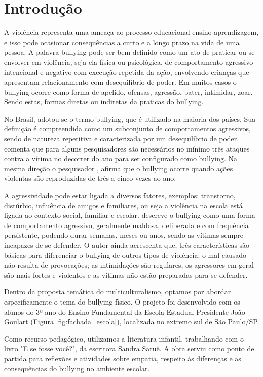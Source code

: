 \pagestyle{simple}
\chapter[]{Introdução}
A violência representa uma ameaça ao processo educacional ensino aprendizagem, e isso pode ocasionar consequências a curto e a longo prazo na vida de uma pessoa. A palavra bullying pode ser bem definido como um ato de praticar ou se envolver em violência, seja ela física ou psicológica, de comportamento agressivo intencional e negativo com execução repetida da ação, envolvendo crianças que apresentam relacionamento com desequilíbrio de poder. Em muitos casos o bullying ocorre como forma de apelido, ofensas, agressão, bater, intimidar, zoar. Sendo estas, formas diretas ou indiretas da praticas do bullying. 

No Brasil, adotou-se o termo bullying, que é utilizado na maioria dos países. Sua definição é compreendida como um subconjunto de comportamentos agressivos, sendo de natureza repetitiva e caracterizada por um desequilíbrio de poder.  comenta que para alguns pesquisadores são necessários no mínimo três ataques contra a vítima no decorrer do ano para ser configurado como bullying. Na mesma direção o pesquisador , afirma que o bullying ocorre quando ações violentas são reproduzidas de três a cinco vezes ao ano. 

A agressividade pode estar ligada a diversos fatores, exemplos: transtorno, distúrbio, influência de amigos e familiares, ou seja a violência na escola está ligada ao contexto social, familiar e escolar.  descreve o bullying como uma forma de comportamento agressivo, geralmente maldosa, deliberada e com frequência persistente, podendo durar semanas, meses ou anos, sendo as vítimas sempre incapazes de se defender. O autor ainda acrescenta que, três características são básicas para diferenciar o bullying de outros tipos de violência: o mal causado não resulta de provocações; as intimidações são regulares, os agressores em geral são mais fortes e violentos e as vítimas não estão preparadas para se defender. 

Dentro da proposta temática do multiculturalismo, optamos por abordar especificamente o tema do bullying físico. O projeto foi desenvolvido com os alunos do 3º ano do Ensino Fundamental da Escola Estadual Presidente João Goulart (Figura \ref{fig:fachada_escola}), localizada no extremo sul de São Paulo/SP. 

Como recurso pedagógico, utilizamos a literatura infantil, trabalhando com o livro "E se fosse você?", da escritora Sandra Saruê. A obra serviu como ponto de partida para reflexões e atividades sobre empatia, respeito às diferenças e as consequências do bullying no ambiente escolar. 

